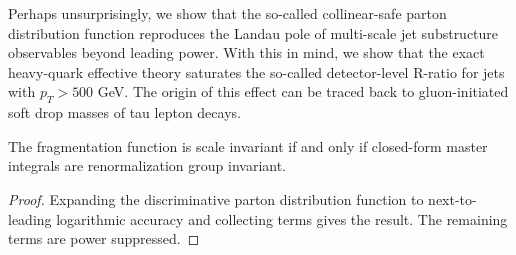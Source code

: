 Perhaps unsurprisingly, we show that the so-called collinear-safe parton
distribution function reproduces the Landau pole of multi-scale jet
substructure observables beyond leading power. With this in mind, we
show that the exact heavy-quark effective theory saturates the so-called
detector-level R-ratio for jets with $p_T > 500$ GeV. The origin of this
effect can be traced back to gluon-initiated soft drop masses of tau
lepton decays.

\begin{corollary}[Resummation]\label{thm:2}
The fragmentation function is scale invariant if and only if closed-form
master integrals are renormalization group invariant.
\end{corollary}

\begin{proof}
Expanding the discriminative parton distribution function to
next-to-leading logarithmic accuracy and collecting terms gives the
result. The remaining terms are power suppressed.
\end{proof}

